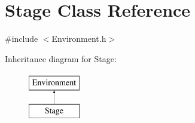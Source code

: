 \hypertarget{class_stage}{}\section{Stage Class Reference}
\label{class_stage}


{\ttfamily \#include $<$Environment.\+h$>$}

Inheritance diagram for Stage\+:\begin{figure}[H]
\begin{center}
\leavevmode
\includegraphics[height=2.000000cm]{class_stage}
\end{center}
\end{figure}
